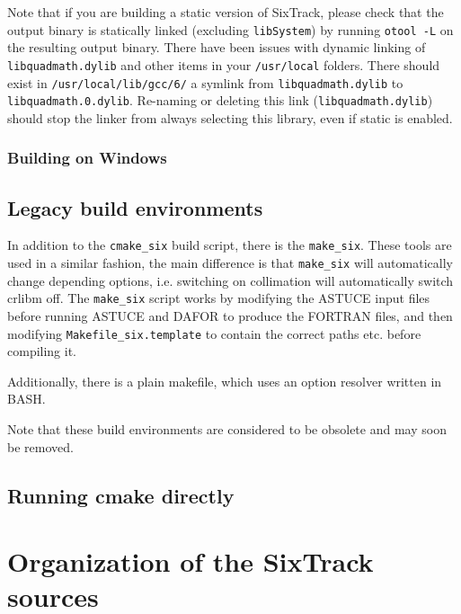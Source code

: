 \documentclass[english,BCOR=0mm,DIV=18]{scrartcl}
\begin{document}
Note that if you are building a static version of SixTrack, please check that the output binary is statically linked (excluding \texttt{libSystem}) by running \texttt{otool -L} on the resulting output binary.
There have been issues with dynamic linking of \texttt{libquadmath.dylib} and other items in your \texttt{/usr/local} folders.
There should exist in \texttt{/usr/local/lib/gcc/6/} a symlink from \texttt{libquadmath.dylib} to \texttt{libquadmath.0.dylib}.
Re-naming or deleting this link (\texttt{libquadmath.dylib}) should stop the linker from always selecting this library, even if static is enabled.

\subsubsection{Building on Windows}


\subsection{Legacy build environments}

In addition to the \texttt{cmake\_six} build script, there is the \texttt{make\_six}.
These tools are used in a similar fashion, the main difference is that \texttt{make\_six} will automatically change depending options, i.e. switching on collimation will automatically switch crlibm off.
The \texttt{make\_six} script works by modifying the ASTUCE input files before running ASTUCE and DAFOR to produce the FORTRAN files, and then modifying \texttt{Makefile\_six.template} to contain the correct paths etc. before compiling it.

Additionally, there is a plain makefile, which uses an option resolver written in BASH.

Note that these build environments are considered to be obsolete and may soon be removed.

\subsection{Running cmake directly}

\section{Organization of the SixTrack sources}
\end{document}
